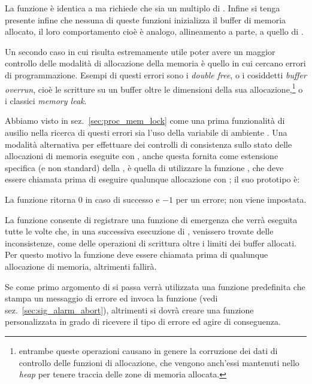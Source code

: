 La funzione è identica a  ma richiede che  sia un
multiplo di .  Infine si tenga presente infine che nessuna di
queste funzioni inizializza il buffer di memoria allocato, il loro
comportamento cioè è analogo, allineamento a parte, a quello di .

Un secondo caso in cui risulta estremamente utile poter avere un maggior
controllo delle modalità di allocazione della memoria è quello in cui cercano
errori di programmazione. Esempi di questi errori sono i \textit{double free},
o i cosiddetti  \textit{buffer overrun}, cioè le
scritture su un buffer oltre le dimensioni della sua
allocazione,\footnote{entrambe queste operazioni causano in genere la
  corruzione dei dati di controllo delle funzioni di allocazione, che vengono
  anch'essi mantenuti nello \textit{heap} per tenere traccia delle zone di
  memoria allocata.} o i classici \textit{memory leak}.

Abbiamo visto in sez.~\ref{sec:proc_mem_lock} come una prima funzionalità di
ausilio nella ricerca di questi errori sia l'uso della variabile di ambiente
.  Una modalità alternativa per effettuare dei
controlli di consistenza sullo stato delle allocazioni di memoria eseguite con
, anche questa fornita come estensione specifica (e non standard)
della , è quella di utilizzare la funzione , che deve
essere chiamata prima di eseguire qualunque allocazione con ; il
suo prototipo è:

\begin{funcproto}{ 
}
{La funzione ritorna $0$ in caso di successo e $-1$ per un errore;
   non viene impostata.} 
\end{funcproto}

La funzione consente di registrare una funzione di emergenza che verrà
eseguita tutte le volte che, in una successiva esecuzione di ,
venissero trovate delle inconsistenze, come delle operazioni di scrittura
oltre i limiti dei buffer allocati. Per questo motivo la funzione deve essere
chiamata prima di qualunque allocazione di memoria, altrimenti fallirà.

Se come primo argomento di  si passa  verrà utilizzata
una funzione predefinita che stampa un messaggio di errore ed invoca la
funzione  (vedi sez.~\ref{sec:sig_alarm_abort}), altrimenti si
dovrà creare una funzione personalizzata in grado di ricevere il tipo di
errore ed agire di conseguenza.

